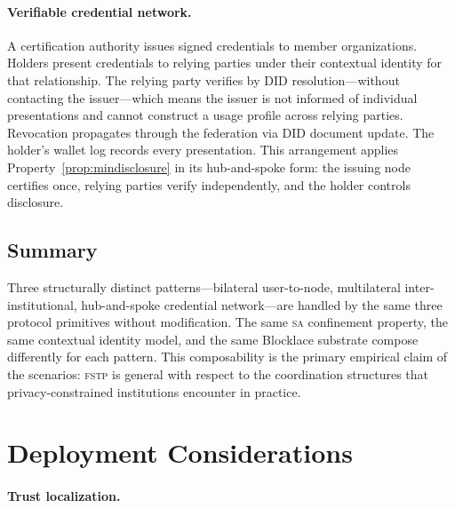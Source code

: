 \documentclass[12pt]{article}
\newcommand{\SA}{\textsc{sa}}
\newcommand{\FSTP}{\textsc{fstp}}
\begin{document}
	\paragraph{Verifiable credential network.}
	
	A certification authority issues signed credentials to member
	organizations. Holders present credentials to relying parties under
	their contextual identity for that relationship. The relying party
	verifies by DID resolution---without contacting the issuer---which
	means the issuer is not informed of individual presentations and
	cannot construct a usage profile across relying parties. Revocation
	propagates through the federation via DID document update. The
	holder's wallet log records every presentation. This arrangement
	applies Property~\ref{prop:mindisclosure} in its hub-and-spoke form:
	the issuing node certifies once, relying parties verify independently,
	and the holder controls disclosure.
	
	\subsection{Summary}
	
	Three structurally distinct patterns---bilateral user-to-node,
	multilateral inter-institutional, hub-and-spoke credential
	network---are handled by the same three protocol primitives without
	modification. The same \SA{} confinement property, the same contextual
	identity model, and the same Blocklace substrate compose differently
	for each pattern. This composability is the primary empirical claim of
	the scenarios: \FSTP{} is general with respect to the coordination
	structures that privacy-constrained institutions encounter in practice.
	
	
	\section{Deployment Considerations}
	\label{sec:discussion}
	
	\paragraph{Trust localization.}
	
\end{document}
